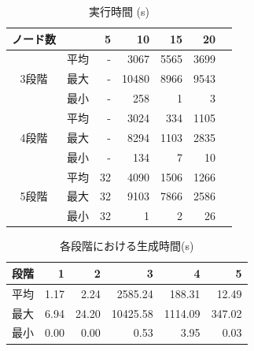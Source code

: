 \documentclass[exploratorypaper]{jsaiart} %
\begin{document}
\begin{table}[htbp]
\caption{実行時間 (s)}
\label{tbl:result2}
\begin{tabular}{c|crrrrr}
    ノード数& & 5&	10&   15&	 20\\
    \hline \hline
         & 平均& -&  3067& 5565&  3699\\
    3段階& 最大& -& 10480& 8966&  9543\\
         & 最小& -&   258&    1&	  3\\
    \hline
         & 平均& -&  3024&   334& 1105\\
    4段階& 最大& -&  8294&  1103& 2835\\
         & 最小& -&   134&     7&    10\\
    \hline
         & 平均& 32&  4090&  1506& 1266\\
    5段階& 最大& 32&  9103&  7866& 2586\\
         & 最小& 32&     1&     2&   26\\
    \hline
\end{tabular}
\end{table}

\begin{table}[htbp]
\caption{各段階における生成時間(s)}
\label{tbl:result3}
\begin{tabular}{c|rrrrr}
    段階&	1&	2&	3&	4&	5\\
    \hline
    \hline
    平均&	1.17&	2.24&	2585.24&	188.31&     12.49\\
    最大&	6.94&	24.20&	10425.58&	1114.09&	347.02\\
    最小&	0.00&	0.00&	0.53&	    3.95&	    0.03\\
    \hline
\end{tabular}
\end{table}


\end{document}
